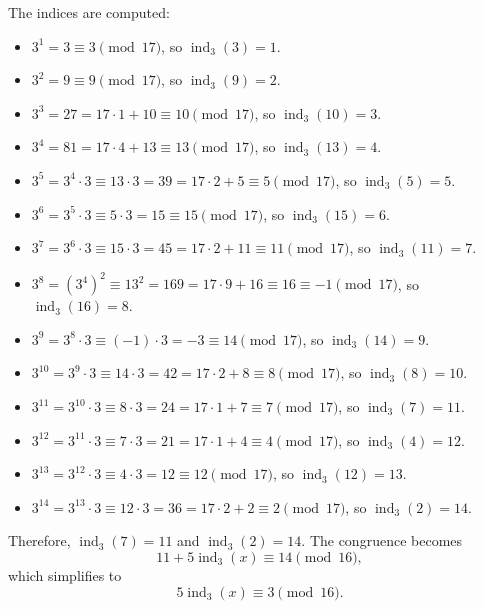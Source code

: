 \begin{enumerate}
\begin{enumerate}
\begin{subanswer}
      The indices are computed:
      \begin{itemize}
        \item $3^1 = 3 \equiv 3 \pmod{17}$, so $\operatorname{ind}_3(3) = 1$.
        \item $3^2 = 9 \equiv 9 \pmod{17}$, so $\operatorname{ind}_3(9) = 2$.
        \item $3^3 = 27 = 17 \cdot 1 + 10 \equiv 10 \pmod{17}$, so $\operatorname{ind}_3(10) = 3$.
        \item $3^4 = 81 = 17 \cdot 4 + 13 \equiv 13 \pmod{17}$, so $\operatorname{ind}_3(13) = 4$.
        \item $3^5 = 3^4 \cdot 3 \equiv 13 \cdot 3 = 39 = 17 \cdot 2 + 5 \equiv 5 \pmod{17}$, so $\operatorname{ind}_3(5) = 5$.
        \item $3^6 = 3^5 \cdot 3 \equiv 5 \cdot 3 = 15 \equiv 15 \pmod{17}$, so $\operatorname{ind}_3(15) = 6$.
        \item $3^7 = 3^6 \cdot 3 \equiv 15 \cdot 3 = 45 = 17 \cdot 2 + 11 \equiv 11 \pmod{17}$, so $\operatorname{ind}_3(11) = 7$.
        \item $3^8 = (3^4)^2 \equiv 13^2 = 169 = 17 \cdot 9 + 16 \equiv 16 \equiv -1 \pmod{17}$, so $\operatorname{ind}_3(16) = 8$.
        \item $3^9 = 3^8 \cdot 3 \equiv (-1) \cdot 3 = -3 \equiv 14 \pmod{17}$, so $\operatorname{ind}_3(14) = 9$.
        \item $3^{10} = 3^9 \cdot 3 \equiv 14 \cdot 3 = 42 = 17 \cdot 2 + 8 \equiv 8 \pmod{17}$, so $\operatorname{ind}_3(8) = 10$.
        \item $3^{11} = 3^{10} \cdot 3 \equiv 8 \cdot 3 = 24 = 17 \cdot 1 + 7 \equiv 7 \pmod{17}$, so $\operatorname{ind}_3(7) = 11$.
        \item $3^{12} = 3^{11} \cdot 3 \equiv 7 \cdot 3 = 21 = 17 \cdot 1 + 4 \equiv 4 \pmod{17}$, so $\operatorname{ind}_3(4) = 12$.
        \item $3^{13} = 3^{12} \cdot 3 \equiv 4 \cdot 3 = 12 \equiv 12 \pmod{17}$, so $\operatorname{ind}_3(12) = 13$.
        \item $3^{14} = 3^{13} \cdot 3 \equiv 12 \cdot 3 = 36 = 17 \cdot 2 + 2 \equiv 2 \pmod{17}$, so $\operatorname{ind}_3(2) = 14$.
      \end{itemize}
      
      Therefore, $\operatorname{ind}_3(7) = 11$ and $\operatorname{ind}_3(2) = 14$.
      The congruence becomes
      \[
      11 + 5\operatorname{ind}_3(x) \equiv 14 \pmod{16},
      \]
      which simplifies to
      \[
      5\operatorname{ind}_3(x) \equiv 3 \pmod{16}.
      \]
      

\end{subanswer}
\end{enumerate}
\end{enumerate}

